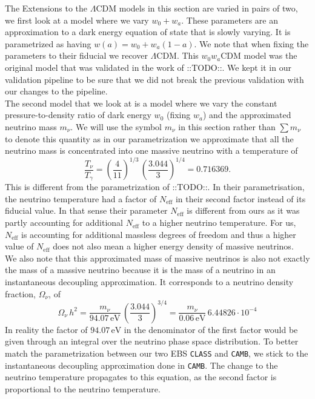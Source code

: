 \documentclass[oneside]{book}
\newcommand*{\marktodo}{{\color{mmcol} ::TODO::}\xspace}
\newcommand*{\class}{{\tt CLASS}\xspace}
\newcommand*{\camb}{{\tt CAMB}\xspace}
\newcommand*{\neff}{N_\mathrm{eff}}
\begin{document}
The Extensions to the $\Lambda$CDM models in this section are varied in pairs of two, we first look at a model where we vary $w_0+w_a$. These parameters are an approximation to a dark energy equation of state that is slowly varying. It is parametrized as having $w(a) = w_0 + w_a(1-a)$. We note that when fixing the parameters to their fiducial we recover $\Lambda$CDM. This $w_0w_a$CDM model was the original model that was validated in the work of \marktodo. We kept it in our validation pipeline to be sure that we did not break the previous validation with our changes to the pipeline.\\
The second model that we look at is a model where we vary the constant pressure-to-density ratio of dark energy $w_0$ (fixing $w_a$) and the approximated neutrino mass $m_\nu$. We will use the symbol $m_\nu$ in this section rather than $\sum m_\nu$ to denote this quantity as in our parametrization we approximate that all the neutrino mass is concentrated into one massive neutrino with a temperature of \begin{equation}
    \frac{T_\nu}{T_\gamma} = \left(\frac{4}{11}\right)^{1/3}\,\left(\frac{3.044}{3}\right)^{1/4} = 0.716369.
\end{equation}  
This is different from the parametrization of \marktodo. In their parametrisation, the neutrino temperature had a factor of $\neff$ in their second factor instead of its fiducial value. In that sense their parameter $\neff$ is different from ours as it was partly accounting for additional $\neff$ to a higher neutrino temperature. For us, $\neff$ is accounting for additional massless degrees of freedom and thus a higher value of $\neff$ does not also mean a higher energy density of massive neutrinos.\\
We also note that this approximated mass of massive neutrinos is also not exactly the mass of a massive neutrino because it is the mass of a neutrino in an instantaneous decoupling approximation. It corresponds to a neutrino density fraction, $\Omega_\nu$, of 
\begin{equation}
    \label{eq:omega_nu}
    \Omega_\nu\,h^2= \frac{m_\nu}{94.07\,\mathrm{eV}}\,\left(\frac{3.044}{3}\right)^{3/4} = \frac{m_\nu}{0.06\,\mathrm{eV}}\,6.44826\cdot10^{-4}
\end{equation}
In reality the factor of $94.07\,\mathrm{eV}$ in the denominator of the first factor would be given through an integral over the neutrino phase space distribution. To better match the parametrization between our two EBS \class and \camb, we stick to the instantaneous decoupling approximation done in \camb. The change to the neutrino temperature propagates to this equation, as the second factor is proportional to the neutrino temperature.\\
\end{document}
